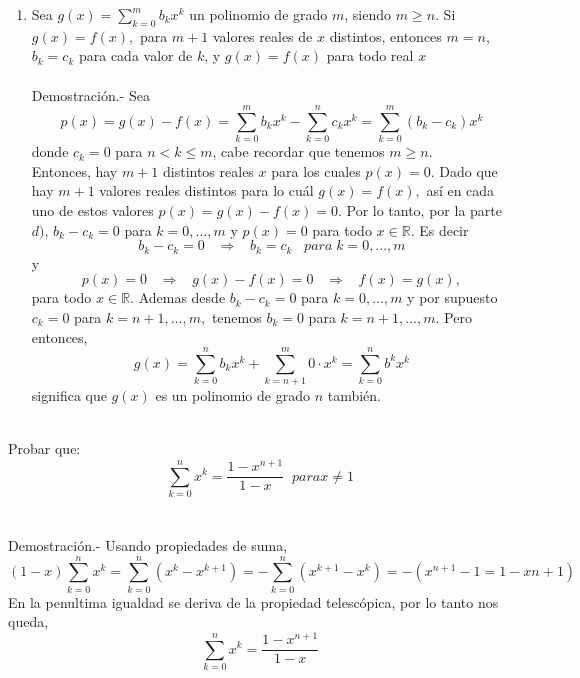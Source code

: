 \begin{teo}
\begin{enumerate}[\bfseries a)]
\item Sea $g(x) = \displaystyle\sum_{k=0}^m b_k x^k$ un polinomio de grado $m$, siendo $m \geq n.$ Si $g(x)=f(x),$ para $m+1$ valores reales de $x$ distintos, entonces $m=n$, $b_k =c_k$ para cada valor de $k$, y $g(x)=f(x)$ para todo real $x$\\\\
Demostración.- \; Sea $$p(x)=g(x)-f(x) = \displaystyle\sum_{k=0}^m b_k x^k - \sum_{k=0}^n c_k x^k = \sum_{k=0}^m (b_k - c_k)x^k$$ donde $c_k=0$ para $n< k \leq m$, cabe recordar que tenemos $m \geq n$.\\
Entonces, hay $m+1$ distintos reales $x$ para los cuales $p(x)=0$. Dado que hay $m+1$ valores reales distintos para lo cuál $g(x)=f(x),$ así en cada uno de estos valores $p(x)=g(x)-f(x)=0$. Por lo tanto, por la parte $d)$, $b_k-c_k =0$ para $k=0,...,m$ y $p(x)=0$ para todo $x \in \mathbb{R}$. Es decir $$b_k - c_k =0 \; \; \; \Rightarrow \; \; \; b_k=c_k \; \; \; para \; k=0,...,m$$ y $$p(x)=0 \; \; \; \Rightarrow \; \; \; g(x)-f(x)=0 \; \; \; \Rightarrow \; \; \; f(x)=g(x),$$ para todo $x \in \mathbb{R}$. Ademas desde $b_k -c_k =0$ para $k=0,..., m$ y por supuesto $c_k=0$ para $k=n+1, ... , m,$ tenemos $b_k=0$ para $k= n+1, ... , m.$ Pero entonces, $$g(x)=\displaystyle\sum_{k=0}^n b_k x^k + \sum_{k=n+1}^m 0 \cdot x^k = \sum_{k=0}^n b^k x^k$$ significa que $g(x)$ es un polinomio de grado $n$ también.\\\\
\end{enumerate}
\end{teo}

\begin{col.}Probar que:
$$\displaystyle\sum_{k=0}^n x^k = \dfrac{1 - x^{n+1}}{1-x} \; \; para x\neq 1$$\\\\
Demostración.- \; Usando propiedades de suma, $$(1-x)\displaystyle\sum_{k=0}^n x^k = \sum_{k=0}^n (x^k - x^{k+1}) = - \sum_{k=0}^n (x^{k+1} - x^k) = -(x^{n+1} -1 = 1 - x{n+1})$$
En la penultima igualdad se deriva de la propiedad telescópica, por lo tanto nos queda,
$$\displaystyle\sum_{k=0}^n x^k = \dfrac{1 - x^{n+1}}{1-x}$$ \\\\
\end{col.}

